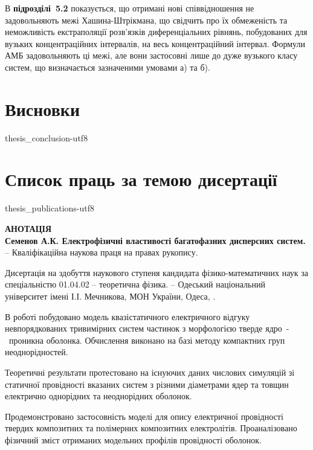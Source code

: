 \documentclass[twoside,a4paper,14pt]{vakaref-utf8}
\begin{document}
В {\bf підрозділі~5.2} показується, що отримані нові співвідношення не задовольняють межі Хашина-Штрікмана, що свідчить про їх обмеженість та неможливість  екстраполяції розв'язків диференціальних рівнянь, побудованих для вузьких концентраційних інтервалів, на весь концентраційний інтервал. Формули АМБ задовольняють ці межі, але вони застосовні лише до дуже вузького класу систем, що визначається зазначеними умовами а) та б).


\part{Висновки}
\vspace{-6.5pt}

{thesis_conclusion-utf8}

\part{Список праць за темою дисертації}

{thesis_publications-utf8}

\vspace{-7pt}



\bigskip

\begin{center}
	{\normalfont \textbf{
			АНОТАЦІЯ\\
			Семенов А.К. Електрофізичні властивості багатофазних дисперсних систем.} -- Кваліфікаційна наукова праця на правах рукопису.}
\end{center}
\vskip 5pt

Дисертація на здобуття наукового ступеня кандидата фізико-матема\-тичних наук за спеціальністю 01.04.02 -- теоретична фізика. -- Одеський національний університет імені І.І. Мечникова, МОН України, Одеса, \the\year.

\vskip 5pt

В роботі побудовано модель квазістатичного електричного відгуку невпорядкованих тривимірних систем частинок з морфологією тверде ядро~-~проникна оболонка. Обчислення виконано на базі методу компактних груп неоднорідностей.

Теоретичні результати протестовано на існуючих даних числових симуляцій зі статичної провідності вказаних систем з різними діаметрами ядер та товщин електрично однорідних та неоднорідних оболонок. 

Продемонстровано застосовність моделі для опису електричної провідності твердих композитних та полімерних композитних електролітів. Проаналізовано фізичний зміст отриманих модельних профілів провідності оболонок. 
\end{document}

